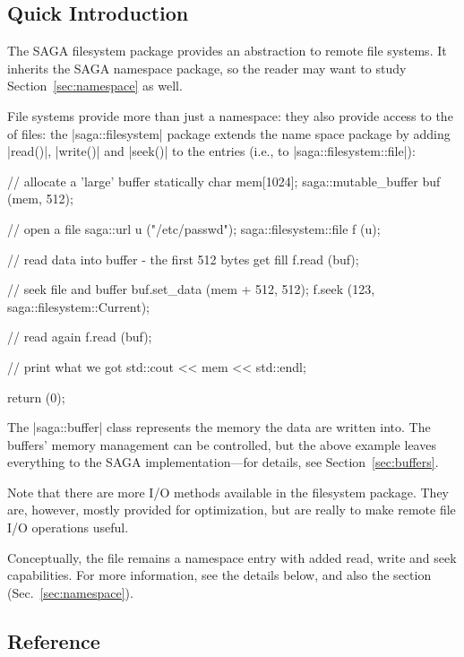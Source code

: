 
 \subsection{Quick Introduction}

  The SAGA filesystem package provides an abstraction to remote
  file systems.  It inherits the SAGA namespace package, so the
  reader may want to study Section~\ref{sec:namespace} as well.

  File systems provide more than just a namespace: they also provide
  access to the  of files:  the |saga::filesystem| package
  extends the name space package by adding |read()|, |write()| and
  |seek()| to the entries (i.e., to |saga::filesystem::file|):

  \begin{mycode}[label=Accessing a file]
  // allocate a 'large' buffer statically
  char mem[1024];
  saga::mutable_buffer buf (mem, 512);

  // open a file
  saga::url u ("/etc/passwd");
  saga::filesystem::file f (u);

  // read data into buffer - the first 512 bytes get fill
  f.read (buf);

  // seek file and buffer
  buf.set_data (mem + 512, 512);
  f.seek (123, saga::filesystem::Current);

  // read again
  f.read (buf);

  // print what we got
  std::cout << mem << std::endl;

  return (0);
  \end{mycode}

  The |saga::buffer| class represents the memory the data are written
  into.  The buffers' memory management can be controlled, but the above
  example leaves everything to the SAGA implementation---for
  details, see Section~\ref{sec:buffers}.

  Note that there are more I/O methods available in the filesystem
  package.  They are, however, mostly provided for optimization,  but
  are really  to make remote file I/O operations useful.

  Conceptually, the file remains a namespace entry with added read,
  write and seek capabilities.  For more information, see the details
  below, and also the section 
  (Sec.~\ref{sec:namespace}).
  
 \subsection{Reference}


